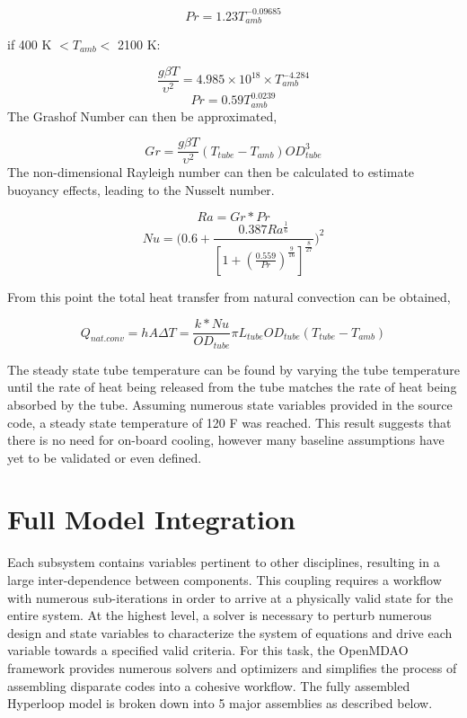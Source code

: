 \documentclass[heading.tex]{subfiles}
\begin{document}
\begin{equation*}
Pr = 1.23 T_{amb}^{-0.09685}
\end{equation*}

if 400 K $<  T_{amb}  <$ 2100 K:


\begin{equation*}
\frac{g \beta T} {\upsilon^2}  = 4.985\times10^{18} \times T_{amb}^{-4.284}
\end{equation*}
\begin{equation*}
Pr = 0.59 T_{amb}^{0.0239}
\end{equation*}
The Grashof Number can then be approximated,


\begin{equation*}
Gr = \frac{g \beta T} {\upsilon^2}  (T_{tube}-T_{amb}) {OD}_{tube}^3
\end{equation*}
The non-dimensional Rayleigh number can then be calculated to estimate buoyancy effects, leading to the Nusselt number.


\begin{equation*}
Ra = Gr * Pr
\end{equation*}
\begin{equation*}
Nu = \Bigg(0.6 + \frac{0.387Ra^{\frac{1}{6}}}{[1+(\frac{0.559}{Pr})^{\frac{9}{16}}]^{\frac{8}{27}}}\Bigg)^2
\end{equation*}

From this point the total heat transfer from natural convection can be obtained,

\begin{equation*}
Q_{nat. conv} = hA \Delta T = \frac{k*Nu}{ {OD}_{tube}} \pi {L}_{tube} {OD}_{tube} (T_{tube}-T_{amb})
\end{equation*}

The steady state tube temperature can be found by varying the tube temperature until the rate of heat being released from the tube
matches the rate of heat being absorbed by the tube. Assuming numerous state variables provided in the source code, a steady state temperature of 120 F
was reached. This result suggests that there is no need for on-board cooling, however many baseline assumptions have yet to be validated or even defined.

\section{Full Model Integration}

Each subsystem contains variables pertinent to other disciplines, resulting in a large inter-dependence between components. 
This coupling requires a workflow with numerous sub-iterations in order to arrive at a physically valid state for the entire system.
At the highest level, a solver is necessary to perturb numerous design and state variables to characterize the system of equations and drive each variable
towards a specified valid criteria. For this task, the OpenMDAO framework provides numerous solvers and optimizers and simplifies the process of assembling
disparate codes into a cohesive workflow. The fully assembled Hyperloop model is broken down into 5 major assemblies as described below. 
\end{document}
